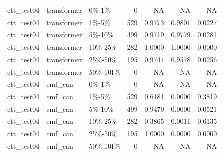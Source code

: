 \begin{tabular}{lllrrrr}
ctt\_test04 & transformer & 0\%-1\% & 0 & NA & NA & NA \\
ctt\_test04 & transformer & 1\%-5\% & 529 & 0.9773 & 0.9801 & 0.0227 \\
ctt\_test04 & transformer & 5\%-10\% & 499 & 0.9719 & 0.9779 & 0.0281 \\
ctt\_test04 & transformer & 10\%-25\% & 282 & 1.0000 & 1.0000 & 0.0000 \\
ctt\_test04 & transformer & 25\%-50\% & 195 & 0.9744 & 0.9578 & 0.0256 \\
ctt\_test04 & transformer & 50\%-101\% & 0 & NA & NA & NA \\
ctt\_test04 & cmf\_can & 0\%-1\% & 0 & NA & NA & NA \\
ctt\_test04 & cmf\_can & 1\%-5\% & 529 & 0.6181 & 0.0000 & 0.3819 \\
ctt\_test04 & cmf\_can & 5\%-10\% & 499 & 0.9479 & 0.0000 & 0.0521 \\
ctt\_test04 & cmf\_can & 10\%-25\% & 282 & 0.3865 & 0.0011 & 0.6135 \\
ctt\_test04 & cmf\_can & 25\%-50\% & 195 & 1.0000 & 0.0000 & 0.0000 \\
ctt\_test04 & cmf\_can & 50\%-101\% & 0 & NA & NA & NA \\
\bottomrule
\end{tabular}
